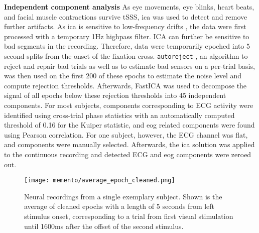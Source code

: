 \textbf{Independent component analysis} As eye movements, eye blinks, heart beats, and facial muscle contractions survive \gls{tSSS}, \gls{ica} was used to detect and remove further artifacts.
As \gls{ica} is sensitive to low-frequency drifts \citep{winkler2015ICA}, the data were first processed with a temporary 1Hz highpass filter. %
ICA can further be sensitive to bad segments in the recording.
Therefore, data were temporarily epoched into 5 second splits from the onset of the fixation cross.
\texttt{autoreject} \citep{jas2017autoreject}, an algorithm to reject and repair bad trials as well as to estimate bad sensors on a per-trial basis, was then used on the first 200 of these epochs to estimate the noise level and compute rejection thresholds.
Afterwards, FastICA \citep{hyvarinen1999fast} was used to decompose the signal of all epochs below these rejection thresholds into 45 independent components.
For most subjects, components corresponding to ECG activity were identified using cross-trial phase statistics \citep{dammers2008integration} with an automatically computed threshold of 0.16 for the Kuiper statistic, and \gls{eog} related components were found using Pearson correlation.
For one subject, however, the ECG channel was flat, and components were manually selected.
Afterwards, the \gls{ica} solution was applied to the continuous recording and detected ECG and \gls{eog} components were zeroed out.

\begin{figure}
	\texttt{[image: memento/average\_epoch\_cleaned.png]}
	\caption[Average neural signal over the trial course]{Neural recordings from a single exemplary subject.
		Shown is the average of cleaned epochs with a length of 5 seconds from left stimulus onset, corresponding to a trial from first visual stimulation until
		1600ms after the offset of the second stimulus.}
	\label{fig:cleanepoch}
\end{figure}


